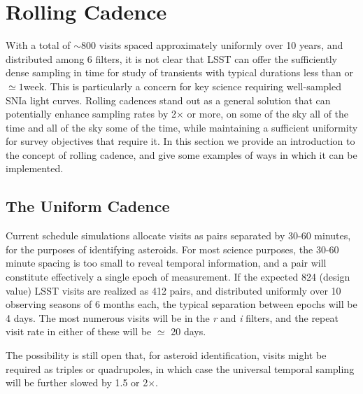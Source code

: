 %
%
%

\section{Rolling Cadence}
\def\secname{rolling}\label{sec:\secname}


With a total of $\sim 800$ visits spaced approximately uniformly over 10
years, and distributed among 6 filters, it is not clear that LSST can
offer the sufficiently dense sampling in time for study of transients
with typical durations less than or $\simeq 1$week. This is particularly
a concern for key science requiring well-sampled SNIa light curves.
Rolling cadences stand out as a general solution that can potentially
enhance sampling rates by 2$\times$ or more, on some of the sky all of
the time and all of the sky some of the time, while maintaining a
sufficient uniformity for survey objectives that require it. In this
section we provide an introduction to the concept of rolling cadence,
and give some examples of ways in which it can be implemented.


\subsection{The Uniform Cadence}

Current schedule simulations allocate visits as pairs separated by 30-60
minutes, for the purposes of identifying asteroids.  For most science
purposes, the 30-60 minute spacing is too small to reveal temporal
information, and a pair will constitute effectively a single epoch of
measurement.  If the expected 824 (design value) LSST visits are
realized as 412 pairs, and distributed uniformly over 10 observing
seasons of 6 months each, the typical separation between epochs will be
4 days.   The most numerous visits will be in the {\it r} and {\it i}
filters, and the repeat visit rate in either of these will be $\simeq$
20 days.

The possibility is still open that, for asteroid identification, visits
might be required as triples or quadrupoles, in which case the universal
temporal sampling will be further slowed by 1.5 or 2$\times$.

